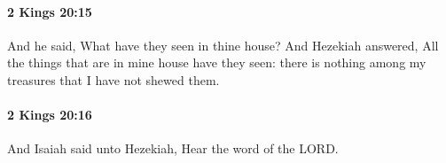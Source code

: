 		\paragraph{2 Kings 20:15} %
			\label{2KINGS-20-15}

			And he said, What have they seen in thine house? And Hezekiah answered, All the things that are in mine house have they seen: there is nothing among my treasures that I have not shewed them.


		\paragraph{2 Kings 20:16} %
			\label{2KINGS-20-16}

			And Isaiah said unto Hezekiah, Hear the word of the LORD.


